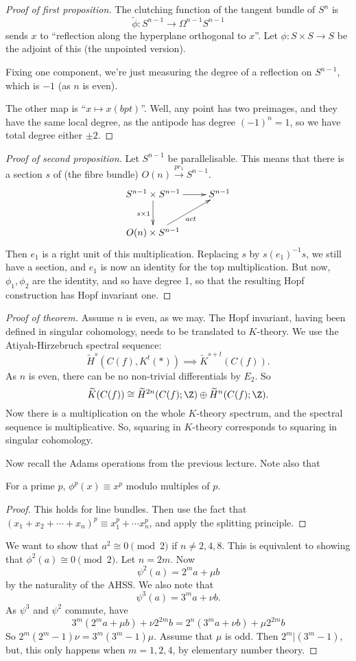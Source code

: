 \documentclass[11pt]{article}
\begin{document}
\begin{MarkusHopfInvOnePractice}
\begin{proof}[Proof of first proposition]
The clutching function of the tangent bundle of $S^n$ is
\[\widetilde\phi:S^{n-1} \to\Omega^{n-1}S^{n-1}\]
sends $x$ to ``reflection along the hyperplane orthogonal to $x$''. Let $\phi:S\times S\to S$ be the adjoint of this (the unpointed version).

Fixing one component, we're just measuring the degree of a reflection on $S^{n-1}$, which is $-1$ (as $n$ is even).

The other map is ``$x\mapsto x(bpt)$''. Well, any point has two preimages, and they have the same local degree, as the antipode has degree $(-1)^n=1$, so we have total degree either $\pm2$.
\end{proof}
\begin{proof}[Proof of second proposition]
Let $S^{n-1}$ be parallelisable. This means that there is a section $s$ of (the fibre bundle) $O(n)\overset{pr_1}{\to}S^{n-1}$.
\[\xymatrix{S^{n-1}\times S^{n-1}\ar[r]\ar[d]_{s\times 1}&S^{n-1}\\
O(n)\times S^{n-1}\ar[ur]_{act}&
}\]
Then $e_1$ is a right unit of this multiplication. Replacing $s$ by $s(e_1)^{-1}s$, we still have a section, and $e_1$ is now an identity for the top multiplication. But now, $\phi_1,\phi_2$ are the identity, and so have degree 1, so that the resulting Hopf construction has Hopf invariant one.
\end{proof}
\begin{proof}[Proof of theorem]
Assume $n$ is even, as we may.
The Hopf invariant, having been defined in singular cohomology, needs to be translated to $K$-theory. We use the Atiyah-Hirzebruch spectral sequence:
\[\widetilde H^s(C(f),K^t(\ast))\implies \widetilde K^{s+t}(C(f)).\]
As $n$ is even, there can be no non-trivial differentials by $E_2$. So 
\[\widetilde K(C(f))\cong\widetilde H^{2n}(C(f);\Z)\oplus \widetilde H^n(C(f);\Z).\]
Now there is a multiplication on the whole $K$-theory spectrum, and the spectral sequence is multiplicative. So, squaring in $K$-theory corresponds to squaring in singular cohomology.

Now recall the Adams operations from the previous lecture. Note also that
\begin{lem*}
For a prime $p$, $\phi^p(x)\equiv x^p$ modulo multiples of $p$.
\end{lem*}
\begin{proof}
This holds for line bundles. Then use the fact that $(x_1+x_2+\cdots+x_n)^p\equiv x_1^p+\cdots x_n^p$, and apply the splitting principle.
\end{proof}
We want to show that $a^2\cong 0\pmod{2}$ if $n\neq2,4,8$. This is equivalent to showing that $\phi^2(a)\cong 0\pmod{2}$. Let $n=2m$. Now
\[\psi^2(a)=2^ma+\mu b\]
by the naturality of the AHSS. We also note that
\[\psi^3(a)=3^ma+\nu b.\]
As $\psi^3$ and $\psi^2$ commute, have
\[3^m(2^ma+\mu b)+\nu 2^{2m}b=2^n(3^ma+\nu b)+\mu2^{2m}b\]
So $2^m(2^m-1)\nu= 3^m(3^{m}-1)\mu$.
Assume that $\mu$ is odd. Then $2^m|(3^{m}-1)$, but, this only happens when $m=1,2,4$, by elementary number theory.
\end{proof}


\pagebreak
\end{MarkusHopfInvOnePractice}
\end{document}
